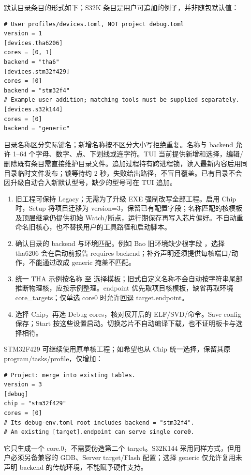 \documentclass[UTF8,a4paper,11pt,oneside,fontset=none]{ctexart}
\newcommand{\code}[1]{\texttt{\detokenize{#1}}}
\begin{document}
默认目录条目的形式如下；S32K 条目是用户可追加的例子，并非随包默认值：
\par\noindent\begin{minipage}{\linewidth}
\begin{lstlisting}
# User profiles/devices.toml, NOT project debug.toml
version = 1
[devices.tha6206]
cores = [0, 1]
backend = "tha6"
[devices.stm32f429]
cores = [0]
backend = "stm32f4"
# Example user addition; matching tools must be supplied separately.
[devices.s32k144]
cores = [0]
backend = "generic"
\end{lstlisting}
\end{minipage}\par
目录名称区分实际键名；新增名称按不区分大小写拒绝重复。名称与 backend 允许 1--64 个字母、数字、点、下划线或连字符。TUI 当前提供新增和选择，编辑/删除既有条目需直接维护目录文件。追加过程持有跨进程锁，读入最新内容后用同目录临时文件发布；锁等待约 2 秒，失败给出路径，不盲目覆盖。已有目录不会因升级自动合入新默认型号，缺少的型号可在 TUI 追加。

\begin{enumerate}
\item 旧工程可保持 Legacy；无需为了升级 EXE 强制改写全部工程。启用 Chip 时，Setup 将项目迁移为 version=3，保留已有配置字段；名称匹配的核模板及顶层继承仍提供初始 Watch/断点，运行期保存再写入芯片偏好。不自动重命名旧核心，也不替换用户的工具路径和启动脚本。
\item 确认目录的 backend 与环境匹配。例如 Bao 旧环境缺少根字段 \code{backend="tha6"}，选择 tha6206 会在启动前报告 requires backend；补齐声明还须提供每核端口/动作，不能通过改成 generic 掩盖不匹配。
\item 统一 THA 示例按名称 \code{core.0} 至 \code{core.3} 选择模板；旧式自定义名称不会自动按字符串尾部推断物理核，应按示例整理。endpoint 优先取项目核模板，缺省再取环境 core\_targets；仅单选 core0 时允许回退 target.endpoint。
\item 选择 Chip，再选 Debug cores，核对展开后的 ELF/SVD/命令。Save config 保存；Start 按这些设置启动。切换芯片不自动编译下载，也不证明板卡与选择相符。
\end{enumerate}

STM32F429 可继续使用原单核工程；如希望也从 Chip 统一选择，保留其原 program/tasks/profile，仅增加：
\begin{lstlisting}
# Project: merge into existing tables.
version = 3
[debug]
chip = "stm32f429"
cores = [0]
# Its debug-env.toml root includes backend = "stm32f4".
# An existing [target].endpoint can serve single core0.
\end{lstlisting}
它只生成一个 core.0，不需要伪造第二个 target。S32K144 采用同样方式，但用户必须另备兼容的 GDB、Server target/Flash 配置；选择 generic 仅允许复用未声明 backend 的传统环境，不能赋予硬件支持。
\end{document}
